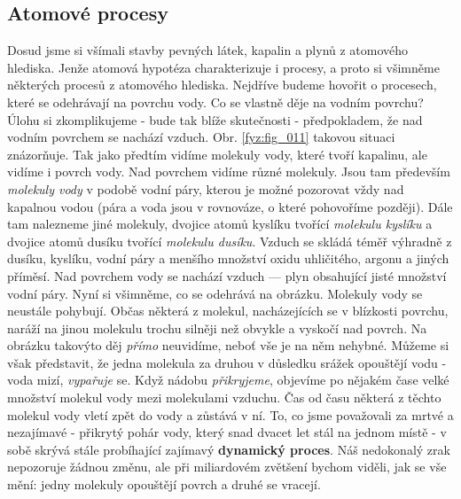 {    \subsection{Atomové procesy}
      Dosud jsme si všímali stavby pevných látek, kapalin a plynů z atomového hlediska. Jenže 
      atomová hypotéza charakterizuje i procesy, a proto si všimněme některých procesů z atomového 
      hlediska. Nejdříve budeme hovořit o procesech, které se odehrávají na povrchu vody. Co se 
      vlastně děje na vodním povrchu? Úlohu si zkomplikujeme - bude tak blíže skutečnosti
      - předpokladem, že nad vodním povrchem se nachází vzduch. Obr. \ref{fyz:fig_011} takovou 
      situaci znázorňuje. Tak jako předtím vidíme molekuly vody, které tvoří kapalinu, ale vidíme i 
      povrch vody. Nad povrchem vidíme různé molekuly. Jsou tam především \emph{molekuly vody} v 
      podobě vodní páry, kterou je možné pozorovat vždy nad kapalnou vodou (pára a voda jsou v 
      rovnováze, o které pohovoříme později). Dále tam nalezneme jiné molekuly, dvojice atomů 
      kyslíku tvořící \emph{molekulu kyslíku} a dvojice atomů dusíku tvořící \emph{molekulu 
      dusíku}. Vzduch se skládá téměř výhradně z dusíku, kyslíku, vodní páry a menšího množství 
      oxidu uhličitého, argonu a jiných příměsí. Nad povrchem vody se nachází vzduch — plyn 
      obsahující jisté množství vodní páry. Nyní si všimněme, co se odehrává na obrázku. Molekuly 
      vody se neustále pohybují. Občas některá z molekul, nacházejících se v blízkosti povrchu, 
      naráží na jinou molekulu trochu silněji než obvykle a vyskočí nad povrch. Na obrázku takovýto 
      děj \emph{přímo} neuvidíme, neboť vše je na něm nehybné. Můžeme si však představit, že jedna 
      molekula za druhou v důsledku srážek opouštějí vodu - voda mizí, \emph{vypařuje} se. Když 
      nádobu \emph{přikryjeme}, objevíme po nějakém čase velké množství molekul vody mezi 
      molekulami vzduchu. Čas od času některá z těchto molekul vody vletí zpět do vody a zůstává v 
      ní. To, co jsme považovali za mrtvé a nezajímavé - přikrytý pohár vody, který snad dvacet let 
      stál na jednom místě - v sobě skrývá stále probíhající zajímavý \textbf{dynamický proces}. 
      Náš nedokonalý zrak nepozoruje žádnou změnu, ale při miliardovém zvětšení bychom viděli, jak 
      se vše mění: jedny molekuly opouštějí povrch a druhé se vracejí.
      
}
